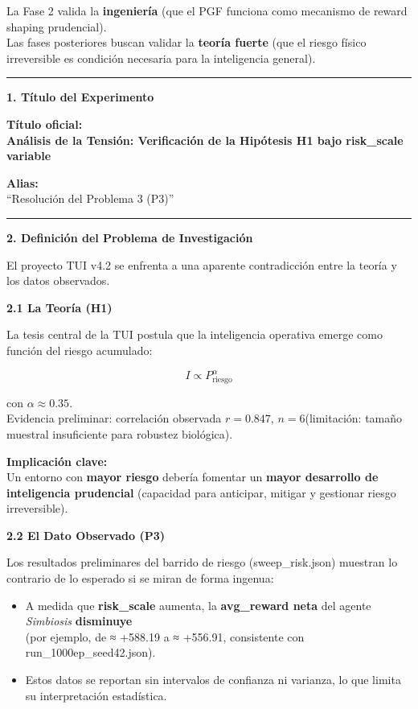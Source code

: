 La Fase 2 valida la \textbf{ingeniería} (que el PGF funciona como
mecanismo de reward shaping prudencial).\\
Las fases posteriores buscan validar la \textbf{teoría fuerte} (que el
riesgo físico irreversible es condición necesaria para la inteligencia
general).

\begin{center}\rule{0.5\linewidth}{0.5pt}\end{center}

\textbf{1. Título del Experimento}

\textbf{Título oficial:}\\
\textbf{Análisis de la Tensión: Verificación de la Hipótesis H1 bajo
risk\_scale variable}

\textbf{Alias:}\\
``Resolución del Problema 3 (P3)''

\begin{center}\rule{0.5\linewidth}{0.5pt}\end{center}

\textbf{2. Definición del Problema de Investigación}

El proyecto TUI v4.2 se enfrenta a una aparente contradicción entre la
teoría y los datos observados.

\textbf{2.1 La Teoría (H1)}

La tesis central de la TUI postula que la inteligencia operativa emerge
como función del riesgo acumulado:

\[I \propto P_{\text{riesgo}}^{\alpha}
\]

con \(\alpha \approx 0.35\).\\
Evidencia preliminar: correlación observada \(r = 0.847\),
\(n = 6\)(limitación: tamaño muestral insuficiente para robustez
biológica).

\textbf{Implicación clave:}\\
Un entorno con \textbf{mayor riesgo} debería fomentar un \textbf{mayor
desarrollo de inteligencia prudencial} (capacidad para anticipar,
mitigar y gestionar riesgo irreversible).

\textbf{2.2 El Dato Observado (P3)}

Los resultados preliminares del barrido de riesgo (sweep\_risk.json)
muestran lo contrario de lo esperado si se miran de forma ingenua:

\begin{itemize}
\item
  A medida que \textbf{risk\_scale} aumenta, la \textbf{avg\_reward
  neta} del agente \emph{Simbiosis} \textbf{disminuye}\\
  (por ejemplo, de ≈ +588.19 a ≈ +556.91, consistente con
  run\_1000ep\_seed42.json).
\item
  Estos datos se reportan sin intervalos de confianza ni varianza, lo
  que limita su interpretación estadística.
\end{itemize}

